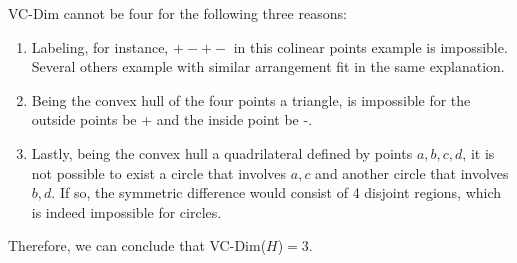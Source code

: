 \bigbreak
VC-Dim cannot be four for the following three reasons:
\begin{enumerate}
  \item Labeling, for instance, $+ - + -$ in this colinear points example is impossible. Several others example with similar arrangement fit in the same explanation. 
  \item Being the convex hull of the four points a triangle, is impossible for the outside points be + and the inside point be -.
  \item Lastly, being the convex hull a quadrilateral defined by points {$a,b,c,d$}, it is not possible to exist a circle that involves $a,c$ and another circle that involves $b,d$. If so, the symmetric difference would consist of 4 disjoint regions, which is indeed impossible for circles.
\end{enumerate}
\bigbreak
Therefore, we can conclude that VC-Dim($H$)$ = 3$. 

